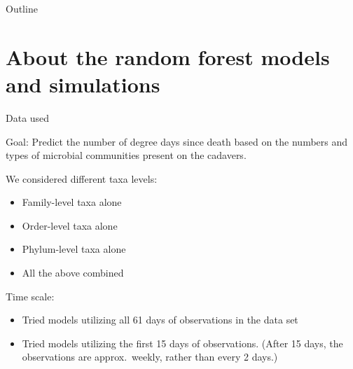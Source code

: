 \documentclass{beamer}
\begin{document}

\begin{frame}{Outline}
  \tableofcontents
\end{frame}








\section[Background]{About the random forest models and simulations}

\begin{frame}{Data used}

{\footnotesize

\noindent Goal: Predict the number of degree days since death based on
the numbers and types of microbial communities present on the cadavers.

\vspace{0.1in}

\noindent We considered different taxa levels:
\begin{itemize}
\item Family-level taxa alone
\item Order-level taxa alone
\item Phylum-level taxa alone
\item All the above combined
\end{itemize}

\vspace{0.1in}

\noindent Time scale:
\begin{itemize}
\item Tried models utilizing all 61 days of observations in the data set
\item Tried models utilizing the first 15 days of observations. (After
  15 days, the observations are approx.~weekly, rather than every 2
  days.)
\end{itemize}
}

\end{frame}
\end{document}
